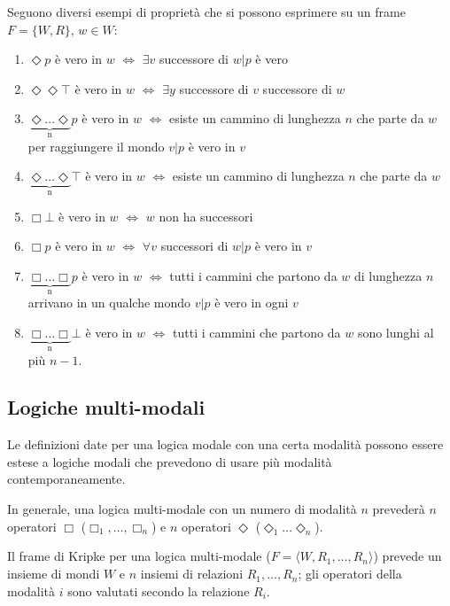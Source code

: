 Seguono diversi esempi di proprietà che si possono esprimere su un frame $F = \lbrace W, R \rbrace$, $w \in W$:

\begin{enumerate}
\item $\Diamond p$ è vero in $w$ $\iff$ $\exists v$ successore di $w | p$ è vero
\item $\Diamond \Diamond \top$ è vero in $w$ $\iff$ $\exists y$ successore di $v$ successore di $w$
\item $\underbrace{\Diamond \dots \Diamond}_\text{n} p$ è vero in $w$ $\iff$ esiste un cammino di lunghezza $n$ che parte da $w$ per raggiungere il mondo $v|p $ è vero in $v$
\item $\underbrace{\Diamond \dots \Diamond}_\text{n} \top$ è vero in $w$ $\iff$ esiste un cammino di lunghezza $n$ che parte da $w$
\item $\Box \bot$ è vero in $w$ $\iff$ $w$ non ha successori
\item $\Box p$ è vero in $w$ $\iff$ $\forall v$ successori di $w | p$ è vero in $v$
\item $\underbrace{\Box \dots \Box}_\text{n} p$ è vero in $w$ $\iff$ tutti i cammini che partono da $w$ di lunghezza $n$ arrivano in un qualche mondo $v|p $ è vero in ogni $v$
\item $\underbrace{\Box \dots \Box}_\text{n} \bot$ è vero in $w$ $\iff$ tutti i cammini che partono da $w$ sono lunghi al più $n-1$.

\end{enumerate}

\subsection{Logiche multi-modali}
Le definizioni date per una logica modale con una certa modalità possono essere estese a logiche modali che prevedono di usare più modalità contemporaneamente.

In generale, una logica multi-modale con un numero di modalità $n$ prevederà $n$ operatori $\Box$ ($\Box_1, \dots, \Box_n$) e $n$ operatori $\Diamond$ ($\Diamond_1 \dots \Diamond_n$).

Il frame di Kripke per una logica multi-modale ($F = \langle W, R_1, \dots, R_n \rangle$) prevede un insieme di mondi $W$ e $n$ insiemi di relazioni $R_1, \dots, R_n$; gli operatori della modalità $i$ sono valutati secondo la relazione $R_i$.